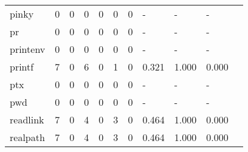 \begin{longtable}{lp{1.10cm}p{1.10cm}p{1.10cm}p{1.10cm}p{1.10cm}p{1.10cm}p{1.10cm}p{1.10cm}p{1.10cm}p{1.10cm}}
pinky     &                      0 &                                  0 &                                 0 &                                0 &                                 0 &                               0 &                              - &                                     - &                                   - \\
pr        &                      0 &                                  0 &                                 0 &                                0 &                                 0 &                               0 &                              - &                                     - &                                   - \\
printenv  &                      0 &                                  0 &                                 0 &                                0 &                                 0 &                               0 &                              - &                                     - &                                   - \\
printf    &                      7 &                                  0 &                                 6 &                                0 &                                 1 &                               0 &                          0.321 &                                 1.000 &                               0.000 \\
ptx       &                      0 &                                  0 &                                 0 &                                0 &                                 0 &                               0 &                              - &                                     - &                                   - \\
pwd       &                      0 &                                  0 &                                 0 &                                0 &                                 0 &                               0 &                              - &                                     - &                                   - \\
readlink  &                      7 &                                  0 &                                 4 &                                0 &                                 3 &                               0 &                          0.464 &                                 1.000 &                               0.000 \\
realpath  &                      7 &                                  0 &                                 4 &                                0 &                                 3 &                               0 &                          0.464 &                                 1.000 &                               0.000 \\

\end{longtable}

